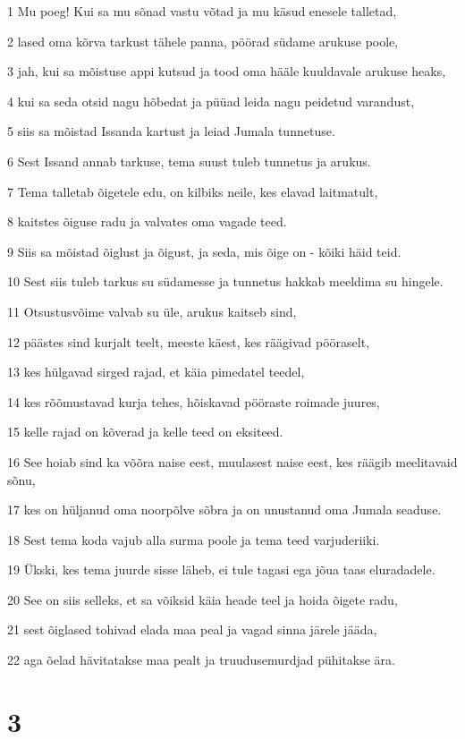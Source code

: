 \par 1 Mu poeg! Kui sa mu sõnad vastu võtad ja mu käsud enesele talletad,
\par 2 lased oma kõrva tarkust tähele panna, pöörad südame arukuse poole,
\par 3 jah, kui sa mõistuse appi kutsud ja tood oma hääle kuuldavale arukuse heaks,
\par 4 kui sa seda otsid nagu hõbedat ja püüad leida nagu peidetud varandust,
\par 5 siis sa mõistad Issanda kartust ja leiad Jumala tunnetuse.
\par 6 Sest Issand annab tarkuse, tema suust tuleb tunnetus ja arukus.
\par 7 Tema talletab õigetele edu, on kilbiks neile, kes elavad laitmatult,
\par 8 kaitstes õiguse radu ja valvates oma vagade teed.
\par 9 Siis sa mõistad õiglust ja õigust, ja seda, mis õige on - kõiki häid teid.
\par 10 Sest siis tuleb tarkus su südamesse ja tunnetus hakkab meeldima su hingele.
\par 11 Otsustusvõime valvab su üle, arukus kaitseb sind,
\par 12 päästes sind kurjalt teelt, meeste käest, kes räägivad pööraselt,
\par 13 kes hülgavad sirged rajad, et käia pimedatel teedel,
\par 14 kes rõõmustavad kurja tehes, hõiskavad pööraste roimade juures,
\par 15 kelle rajad on kõverad ja kelle teed on eksiteed.
\par 16 See hoiab sind ka võõra naise eest, muulasest naise eest, kes räägib meelitavaid sõnu,
\par 17 kes on hüljanud oma noorpõlve sõbra ja on unustanud oma Jumala seaduse.
\par 18 Sest tema koda vajub alla surma poole ja tema teed varjuderiiki.
\par 19 Ükski, kes tema juurde sisse läheb, ei tule tagasi ega jõua taas eluradadele.
\par 20 See on siis selleks, et sa võiksid käia heade teel ja hoida õigete radu,
\par 21 sest õiglased tohivad elada maa peal ja vagad sinna järele jääda,
\par 22 aga õelad hävitatakse maa pealt ja truudusemurdjad pühitakse ära.

\chapter{3}

